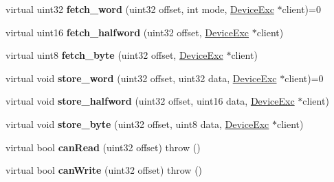 \begin{DoxyCompactItemize}
\item 
\hypertarget{classDeviceMap_aa3051a16728bec8261d031e62edb4fca}{
virtual uint32 {\bfseries fetch\_\-word} (uint32 offset, int mode, \hyperlink{classDeviceExc}{DeviceExc} $\ast$client)=0}
\label{classDeviceMap_aa3051a16728bec8261d031e62edb4fca}

\item 
\hypertarget{classDeviceMap_ac71109d80a98cd1617292f451eed8d36}{
virtual uint16 {\bfseries fetch\_\-halfword} (uint32 offset, \hyperlink{classDeviceExc}{DeviceExc} $\ast$client)}
\label{classDeviceMap_ac71109d80a98cd1617292f451eed8d36}

\item 
\hypertarget{classDeviceMap_a01a27bd6f0a6fbe029609c3a72abde70}{
virtual uint8 {\bfseries fetch\_\-byte} (uint32 offset, \hyperlink{classDeviceExc}{DeviceExc} $\ast$client)}
\label{classDeviceMap_a01a27bd6f0a6fbe029609c3a72abde70}

\item 
\hypertarget{classDeviceMap_a35fca28f44abbd13f9db1e32651b1a10}{
virtual void {\bfseries store\_\-word} (uint32 offset, uint32 data, \hyperlink{classDeviceExc}{DeviceExc} $\ast$client)=0}
\label{classDeviceMap_a35fca28f44abbd13f9db1e32651b1a10}

\item 
\hypertarget{classDeviceMap_a24ff12255b493fc390ffee1241283f8c}{
virtual void {\bfseries store\_\-halfword} (uint32 offset, uint16 data, \hyperlink{classDeviceExc}{DeviceExc} $\ast$client)}
\label{classDeviceMap_a24ff12255b493fc390ffee1241283f8c}

\item 
\hypertarget{classDeviceMap_a2f0ec5a2d3ed8191645d99f3ab555dce}{
virtual void {\bfseries store\_\-byte} (uint32 offset, uint8 data, \hyperlink{classDeviceExc}{DeviceExc} $\ast$client)}
\label{classDeviceMap_a2f0ec5a2d3ed8191645d99f3ab555dce}

\item 
\hypertarget{classDeviceMap_aa4465202ceece719ceb26d24c6a5f454}{
virtual bool {\bfseries canRead} (uint32 offset)  throw ()}
\label{classDeviceMap_aa4465202ceece719ceb26d24c6a5f454}

\item 
\hypertarget{classDeviceMap_a2257514fbcd9acc310cfba5f12574451}{
virtual bool {\bfseries canWrite} (uint32 offset)  throw ()}
\label{classDeviceMap_a2257514fbcd9acc310cfba5f12574451}

\end{DoxyCompactItemize}
